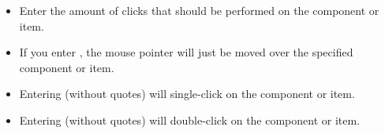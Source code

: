 \begin{itemize}
\item Enter the amount of clicks that should be performed on the component or item.
\item If you enter , the mouse pointer will just be moved over the specified component or item.
\item Entering  (without quotes)  will single-click on the component or item.
\item Entering  (without quotes) will double-click on the component or item. 
\end{itemize}


